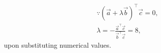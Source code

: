 \solution
\begin{align}
\because	(\vec{a}+\lambda \vec{b})^{\top} \vec{c} = 0,
	\\
	\lambda=-\frac{\vec{a}^{\top}\vec{c}}{\vec{b}^{\top}\vec{c}}
	=8,
\end{align}
upon substituting numerical values.


